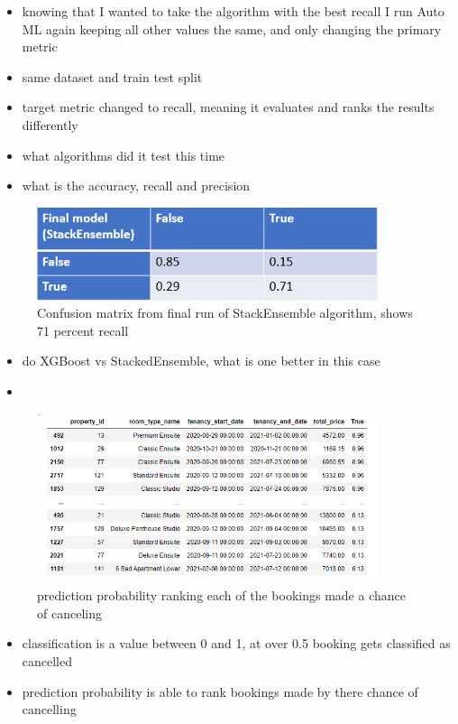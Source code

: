 \begin{itemize}
\item knowing that I wanted to take the algorithm with the best recall I run Auto ML again keeping all other values the same, and only changing the primary metric 
\item same dataset and train test split
\item target metric changed to recall, meaning it evaluates and ranks the results differently 
\item what algorithms did it test this time
\item what is the accuracy, recall and precision
\end{itemize}

\begin{figure}[hbt!]
 \includegraphics[width=10cm]{figures/azure_ml_confusion_matrix.png}
 \caption{Confusion matrix from final run of StackEnsemble algorithm, shows 71 percent recall}
\end{figure}

\begin{itemize}
\item do XGBoost vs StackedEnsemble, what is one better in this case
\item 
\end{itemize}


\begin{figure}[hbt!]
 \includegraphics[width=10cm]{figures/canc_prob.png}
 \caption{prediction probability ranking each of the bookings made a chance of canceling}
\end{figure}

\begin{itemize}
\item classification is a value between 0 and 1, at over 0.5 booking gets classified as cancelled 
\item prediction probability is able to rank bookings made by there chance of cancelling 
\end{itemize}



